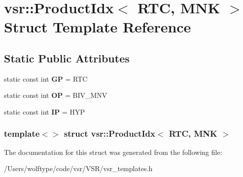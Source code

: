 \hypertarget{structvsr_1_1_product_idx_3_01_r_t_c_00_01_m_n_k_01_4}{\section{vsr\-:\-:Product\-Idx$<$ R\-T\-C, M\-N\-K $>$ Struct Template Reference}
\label{structvsr_1_1_product_idx_3_01_r_t_c_00_01_m_n_k_01_4}
}
\subsection*{Static Public Attributes}
\begin{DoxyCompactItemize}
\item 
\hypertarget{structvsr_1_1_product_idx_3_01_r_t_c_00_01_m_n_k_01_4_a69a24b8681ea85c6b929bc1e8bf93d5c}{static const int {\bfseries G\-P} = R\-T\-C}\label{structvsr_1_1_product_idx_3_01_r_t_c_00_01_m_n_k_01_4_a69a24b8681ea85c6b929bc1e8bf93d5c}

\item 
\hypertarget{structvsr_1_1_product_idx_3_01_r_t_c_00_01_m_n_k_01_4_a8ec15c9f008eba7879c075f796122055}{static const int {\bfseries O\-P} = B\-I\-V\-\_\-\-M\-N\-V}\label{structvsr_1_1_product_idx_3_01_r_t_c_00_01_m_n_k_01_4_a8ec15c9f008eba7879c075f796122055}

\item 
\hypertarget{structvsr_1_1_product_idx_3_01_r_t_c_00_01_m_n_k_01_4_ab4cf88bbd6be0eb77bc8da6efe8e26a8}{static const int {\bfseries I\-P} = H\-Y\-P}\label{structvsr_1_1_product_idx_3_01_r_t_c_00_01_m_n_k_01_4_ab4cf88bbd6be0eb77bc8da6efe8e26a8}

\end{DoxyCompactItemize}
\subsubsection*{template$<$$>$ struct vsr\-::\-Product\-Idx$<$ R\-T\-C, M\-N\-K $>$}



The documentation for this struct was generated from the following file\-:\begin{DoxyCompactItemize}
\item 
/\-Users/wolftype/code/vsr/\-V\-S\-R/vsr\-\_\-templates.\-h\end{DoxyCompactItemize}
